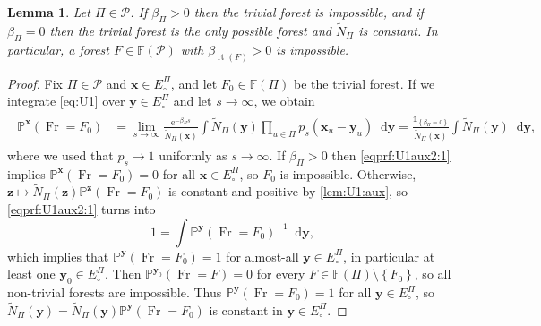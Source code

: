 \documentclass[reqno,draft]{amsart}
\numberwithin{equation}{section}
\theoremstyle{plain}
\newtheorem{lemma}[theorem]{Lemma}
\theoremstyle{remark}
\renewcommand{\P}{\mathbb{P}} %
\newcommand*\diff{\mathop{}\!\mathrm{d}}
\newcommand{\ind}{\mathds{1}}
\newcommand{\e}{\mathrm{e}}
\newcommand{\fpart}{\Pi} %
\DeclareMathOperator{\rt}{rt}
\DeclareMathOperator{\fr}{Fr}
\newcommand{\nn}{\widetilde{N}} %
\newcommand{\la}{\beta} %
\begin{document}
\begin{lemma}\label{lem:U1:aux2}
    Let $\fpart\in \mathcal{P}$. If $\la_\fpart > 0$ then the trivial forest is impossible, and if $\la_\fpart = 0$ then the trivial forest is the only possible forest and $\nn_\fpart$ is constant. In particular, a forest $F\in\mathbb{F}(\mathcal{P})$ with $\la_{\rt(F)} > 0$ is impossible.
\end{lemma}
\begin{proof}
    Fix $\fpart \in \mathcal{P}$ and $\boldsymbol x\in E^\fpart_\circ $, and let $F_0\in \mathbb{F}(\fpart)$ be the trivial forest. If we integrate \cref{eq:U1} over $\boldsymbol y\in E^\fpart_\circ $ and let $s \to \infty$, we obtain
    \begin{align}\begin{split}\label{eqprf:U1aux2:1}
        \P^{\boldsymbol x}(\fr = F_0)
        &= \lim_{s \to \infty}\frac{\e^{-\la_\fpart s}}{\nn_\fpart(\boldsymbol x)} \int \nn_\fpart(\boldsymbol y) \prod_{u\in \fpart}p_s(\boldsymbol x_u-\boldsymbol y_u) \diff \boldsymbol y
        = \frac{\ind_{\left\{ \la_\fpart = 0 \right\} }}{\nn_\fpart(\boldsymbol x)} \int \nn_\fpart(\boldsymbol y) \diff \boldsymbol y,
    \end{split}\end{align}
    where we used that $p_s \to 1$ uniformly as $s\to \infty$. If $\la_\fpart > 0$ then \cref{eqprf:U1aux2:1} implies $\P^{\boldsymbol x}(\fr = F_0) = 0$ for all $\boldsymbol x\in E^\fpart_\circ $, so $F_0$ is impossible. Otherwise, $\boldsymbol z \mapsto \nn_\fpart(\boldsymbol z) \P^{\boldsymbol z}(\fr = F_0)$ is constant and positive by \cref{lem:U1:aux}, so \cref{eqprf:U1aux2:1} turns into \[
        1 = \int \P^{\boldsymbol y}(\fr = F_0)^{-1} \diff \boldsymbol y,
    \] which implies that $\P^{\boldsymbol y}(\fr = F_0) = 1$ for almost-all $\boldsymbol y\in E^\fpart_\circ $, in particular at least one $\boldsymbol y_0\in E^\fpart_\circ $. Then $\P^{\boldsymbol y_0}(\fr = F) = 0$ for every $F\in \mathbb{F}(\fpart)\setminus \left\{ F_0 \right\} $, so all non-trivial forests are impossible. Thus $\P^{\boldsymbol y}(\fr = F_0) = 1$ for all $\boldsymbol y\in E^\fpart_\circ $, so $\nn_\fpart(\boldsymbol y) = \nn_\fpart(\boldsymbol y) \P^{\boldsymbol y}(\fr = F_0)$ is constant in $\boldsymbol y\in E^\fpart_\circ $.


\end{proof}
\end{document}
